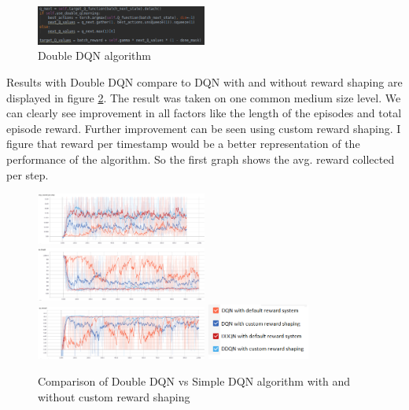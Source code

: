 \documentclass[10pt,twocolumn,letterpaper]{article}
\begin{document}
\begin{figure}[h]
  \centering
    \includegraphics[width=0.50\textwidth]{images/ddqn_change.png}
    \caption{Double DQN algorithm }
    \label{fig:ddqnchange}
\end{figure}

Results with Double DQN compare to DQN with and without reward shaping are displayed in figure \ref{fig:ddqnresults}. The result was taken on one common medium size level. We can clearly see improvement in all factors like the length of the episodes and total episode reward. Further improvement can be seen using custom reward shaping. I figure that reward per timestamp would be a better representation of the performance of the algorithm. So the first graph shows the avg. reward collected per step.


\begin{figure}[h]
  \centering
    \includegraphics[width=0.50\textwidth]{images/dqnVSddqnAvgRew.png}
    \includegraphics[width=0.50\textwidth]{images/dqnVsDdqnEpLength.png}
    \includegraphics[width=0.50\textwidth]{images/dqnVSddqnEpReward.png}
    \includegraphics[width=0.30\textwidth]{images/ddqnLegend.png}
    \caption{Comparison of Double DQN vs Simple DQN algorithm with and without custom reward shaping }
    \label{fig:ddqnresults}
\end{figure}
\end{document}
